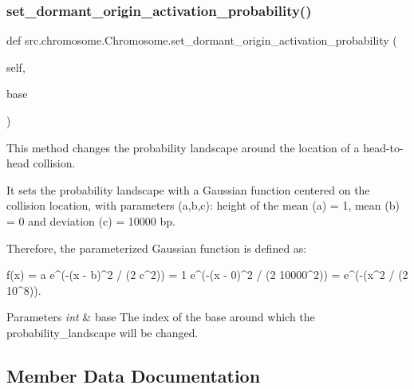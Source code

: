 \subsubsection{\texorpdfstring{set\+\_\+dormant\+\_\+origin\+\_\+activation\+\_\+probability()}{set\_dormant\_origin\_activation\_probability()}}
{\footnotesize\ttfamily def src.\+chromosome.\+Chromosome.\+set\+\_\+dormant\+\_\+origin\+\_\+activation\+\_\+probability (\begin{DoxyParamCaption}\item[{}]{self,  }\item[{}]{base }\end{DoxyParamCaption})}



This method changes the probability landscape around the location of a head-\/to-\/head collision. 

It sets the probability landscape with a Gaussian function centered on the collision location, with parameters (a,b,c)\+: height of the mean (a) = 1, mean (b) = 0 and deviation (c) = 10000 bp.

Therefore, the parameterized Gaussian function is defined as\+: \begin{DoxyVerb}                                f(x) = a e^(-(x - b)^2 / (2 c^2))
                                     = 1 e^(-(x - 0)^2 / (2 10000^2))
                                     =   e^(-(x^2 / (2 10^8)).
\end{DoxyVerb}



\begin{DoxyParams}{Parameters}
{\em int} & base The index of the base around which the probability\+\_\+landscape will be changed. \\
\hline
\end{DoxyParams}


\subsection{Member Data Documentation}
\mbox{\label{classsrc_1_1chromosome_1_1Chromosome_a10a051b6b89395ffd4eafed6e19d35b8}} 
